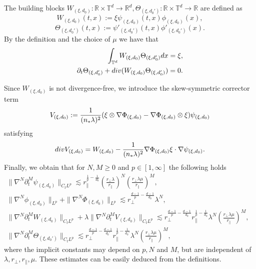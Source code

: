 \documentclass[10pt,a4paper]{amsart}
\numberwithin{equation}{section}
\def\dif{{\mathord{{\rm d}}}}
\def\geq{\geqslant}
\def\div{\mathord{{\rm div}}}
\def\dif{{\mathord{{\rm d}}}}
\def\geq{\geqslant}
\def\div{\mathord{{\rm div}}}
\begin{document}
The building blocks $W_{(\xi,d_0)} :\mathbb{R} \times\mathbb{T}^d \to \mathbb{R}^d,\Theta_{(\xi,d_0')} :\mathbb{R} \times\mathbb{T}^d \to \mathbb{R}$ are defined as
$$W_{(\xi,d_0)}(t,x):=\xi\psi_{(\xi,d_0)}(t,x)\phi_{(\xi,d_0)}(x),$$
$$\Theta_{(\xi,d_0')}(t,x):=\psi'_{(\xi,d_0')}(t,x)\phi'_{(\xi,d_0')}(x).$$
By the definition and the choice of $\mu$ we have that 
\begin{align}
\int _{\mathbb{T}^d}W_{(\xi,d_0)}\Theta_{(\xi,d_0')}\dif x=\xi,\label{eq:intwthe}\\
\partial_t\Theta_{(\xi,d_0')}+ \div (W_{(\xi,d_0)}\Theta_{(\xi,d_0')})=0.\label{eq:ptthe+}
\end{align}


Since $W_{(\xi,d_0)}$ is not divergence-free, we
introduce the skew-symmetric corrector term
\begin{align}
V_{(\xi,d_0)}:=\frac{1}{(n_*\lambda)^2}(\xi\otimes\nabla\Phi_{(\xi,d_0)}-\nabla\Phi_{(\xi,d_0)}\otimes\xi)\psi_{(\xi,d_0)}\notag
\end{align}
satisfying
\begin{align}
\div V_{(\xi,d_0)}
=W_{(\xi,d_0)} -\frac{1}{(n_*\lambda)^2}\nabla\Phi_{(\xi,d_0)}\xi\cdot\nabla\psi_{(\xi,d_0)}.\label{divOmega}
\end{align}
Finally, we obtain that for $N, M \geq 0$ and $p\in [1, \infty]$ the
following holds
\begin{align}
\|\nabla^N\partial_t^M\psi_{(\xi,d_0)}\|_{C_tL^p }\lesssim r_\parallel^{\frac{1}{p}-\frac{1}{d_0}}(\frac{r_\perp\lambda}{r_\parallel})^N(\frac{r_\perp\lambda\mu}{r_\parallel})^M,
&\label{int2}\\
\|\nabla^N\phi_{(\xi,d_0)}\|_{L^p }+\|\nabla^N\Phi_{(\xi,d_0)}\|_{L^p }\lesssim r_\perp^{\frac{d-1}{p}-\frac{d-1}{d_0}}\lambda^{N},
&\label{int3}\\
\|\nabla^N\partial_t^MW_{(\xi,d_0)}\|_{C_tL^p }+\lambda\|\nabla^N\partial_t^MV_{(\xi,d_0)}\|_{C_tL^p }
\lesssim r_\perp^{\frac{d-1}{p}-\frac{d-1}{d_0}}r_\parallel^{\frac{1}{p}-\frac{1}{d_0}}\lambda^{N}(\frac{r_\perp\lambda\mu}{r_\parallel})^M,&\label{int4}\\ \|\nabla^N\partial_t^M\Theta_{(\xi,d_0')}\|_{C_tL^p }\lesssim r_\perp^{\frac{d-1}{p}-\frac{d-1}{d_0'}}r_\parallel^{\frac{1}{p}-\frac{1}{d_0'}}\lambda^{N}(\frac{r_\perp\lambda\mu}{r_\parallel})^M,& \label{int4theta}
\end{align}
where the implicit constants may depend on $p,N$ and $M$, but are independent of $\lambda,r_\perp,r_\parallel,\mu$. These estimates can be easily deduced from the definitions.
\end{document}

